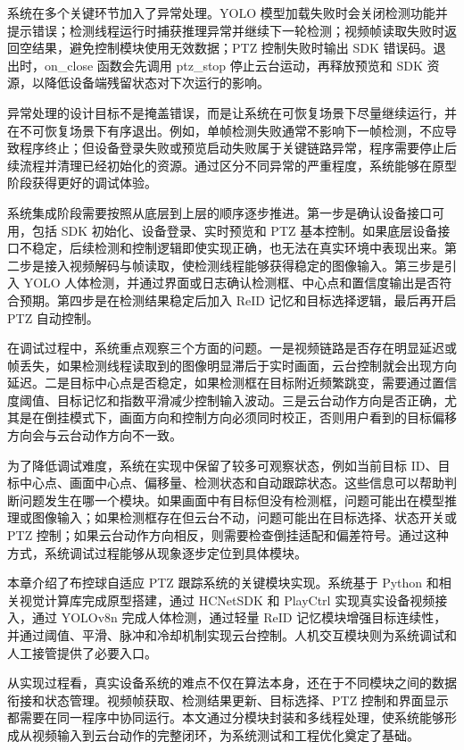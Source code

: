 系统在多个关键环节加入了异常处理。YOLO 模型加载失败时会关闭检测功能并提示错误；检测线程运行时捕获推理异常并继续下一轮检测；视频帧读取失败时返回空结果，避免控制模块使用无效数据；PTZ 控制失败时输出 SDK 错误码。退出时，on\_close 函数会先调用 ptz\_stop 停止云台运动，再释放预览和 SDK 资源，以降低设备端残留状态对下次运行的影响。

异常处理的设计目标不是掩盖错误，而是让系统在可恢复场景下尽量继续运行，并在不可恢复场景下有序退出。例如，单帧检测失败通常不影响下一帧检测，不应导致程序终止；但设备登录失败或预览启动失败属于关键链路异常，程序需要停止后续流程并清理已经初始化的资源。通过区分不同异常的严重程度，系统能够在原型阶段获得更好的调试体验。

系统集成阶段需要按照从底层到上层的顺序逐步推进。第一步是确认设备接口可用，包括 SDK 初始化、设备登录、实时预览和 PTZ 基本控制。如果底层设备接口不稳定，后续检测和控制逻辑即使实现正确，也无法在真实环境中表现出来。第二步是接入视频解码与帧读取，使检测线程能够获得稳定的图像输入。第三步是引入 YOLO 人体检测，并通过界面或日志确认检测框、中心点和置信度输出是否符合预期。第四步是在检测结果稳定后加入 ReID 记忆和目标选择逻辑，最后再开启 PTZ 自动控制。

在调试过程中，系统重点观察三个方面的问题。一是视频链路是否存在明显延迟或帧丢失，如果检测线程读取到的图像明显滞后于实时画面，云台控制就会出现方向延迟。二是目标中心点是否稳定，如果检测框在目标附近频繁跳变，需要通过置信度阈值、目标记忆和指数平滑减少控制输入波动。三是云台动作方向是否正确，尤其是在倒挂模式下，画面方向和控制方向必须同时校正，否则用户看到的目标偏移方向会与云台动作方向不一致。

为了降低调试难度，系统在实现中保留了较多可观察状态，例如当前目标 ID、目标中心点、画面中心点、偏移量、检测状态和自动跟踪状态。这些信息可以帮助判断问题发生在哪一个模块。如果画面中有目标但没有检测框，问题可能出在模型推理或图像输入；如果检测框存在但云台不动，问题可能出在目标选择、状态开关或 PTZ 控制；如果云台动作方向相反，则需要检查倒挂适配和偏差符号。通过这种方式，系统调试过程能够从现象逐步定位到具体模块。

本章介绍了布控球自适应 PTZ 跟踪系统的关键模块实现。系统基于 Python 和相关视觉计算库完成原型搭建，通过 HCNetSDK 和 PlayCtrl 实现真实设备视频接入，通过 YOLOv8n 完成人体检测，通过轻量 ReID 记忆模块增强目标连续性，并通过阈值、平滑、脉冲和冷却机制实现云台控制。人机交互模块则为系统调试和人工接管提供了必要入口。

从实现过程看，真实设备系统的难点不仅在算法本身，还在于不同模块之间的数据衔接和状态管理。视频帧获取、检测结果更新、目标选择、PTZ 控制和界面显示都需要在同一程序中协同运行。本文通过分模块封装和多线程处理，使系统能够形成从视频输入到云台动作的完整闭环，为系统测试和工程优化奠定了基础。
